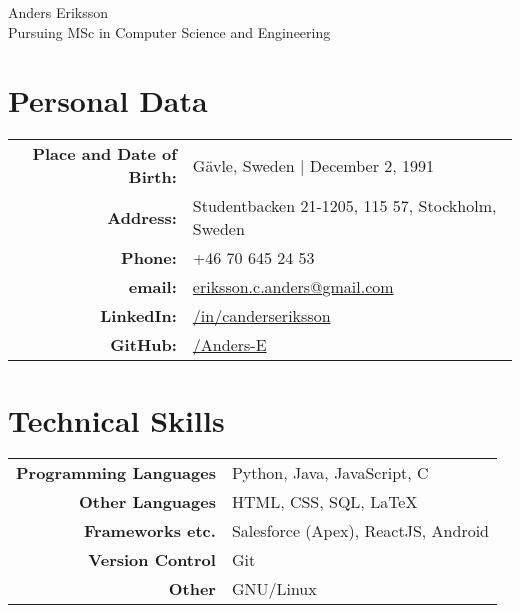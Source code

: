 \documentclass[a4paper,10pt]{article}
\begin{document}
\pagestyle{empty} %


\par{
    \centering
	{
	    \Huge \bitter Anders Eriksson \\
	    \normalfont
	    \normalsize Pursuing MSc in Computer Science and Engineering
	}
	\bigskip\par
}

\section{Personal Data}

\begin{tabular}{rl}
    \textbf{Place and Date of Birth:} & Gävle, Sweden  | December 2, 1991 \\
    \textbf{Address:}   & Studentbacken 21-1205, 115 57, Stockholm, Sweden \\
    \textbf{Phone:}     & +46 70 645 24 53\\
    \textbf{email:}     & \href{mailto:eriksson.c.anders@gmail.com
}{eriksson.c.anders@gmail.com}\\
    \textbf{LinkedIn:}	& \href{http://se.linkedin.com/in/canderseriksson}{/in/canderseriksson}\\
    \textbf{GitHub:}	& \href{http://github.com/Anders-E}{/Anders-E}
\end{tabular}

\section{Technical Skills}
\begin{tabular}{r|l}
\textbf{Programming Languages} & Python, Java, JavaScript, C \\
\textbf{Other Languages} & HTML, CSS, SQL, \LaTeX \\
\textbf{Frameworks etc.} & Salesforce (Apex), ReactJS, Android \\
\textbf{Version Control} & Git \\
\textbf{Other} & GNU/Linux\\
\end{tabular}
\end{document}
